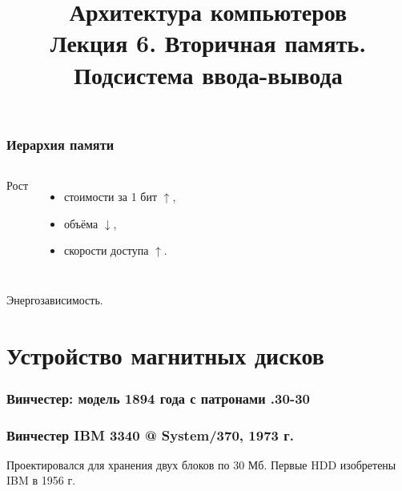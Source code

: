 \newcommand{\h}{}%



\title[Вторичная память. Подсистема I/O (1)]{Архитектура компьютеров\texorpdfstring{\\}{ }Лекция 6. Вторичная память.\texorpdfstring{\\}{ }Подсистема ввода-вывода}



\begin{frame}
\titlepage
\end{frame}


\begin{frame}
\frametitle{Иерархия памяти}
\vspace{-1cm}
\begin{columns}
    \column{7cm}

    \pause \column{4.5cm}
        Рост
        \begin{itemize}
            \item стоимости за 1 бит \pause $\uparrow$,\pause
            \item объёма \pause $\downarrow$,\pause
            \item скорости доступа \pause $\uparrow$.
        \end{itemize}
\end{columns}

\vspace{.5cm}
\pause Энергозависимость.
\end{frame}

\section{Устройство магнитных дисков}

\begin{frame}
\frametitle{Винчестер: модель 1894 года с патронами .30-30}
\end{frame}

\begin{frame}
\frametitle{Винчестер IBM 3340 @ System/370, 1973 г.}
Проектировался для хранения двух блоков по 30 Мб.
\pause Первые HDD изобретены IBM в 1956 г.
\end{frame}

